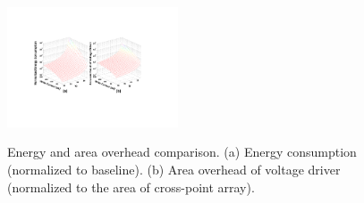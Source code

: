 %
\begin{figure}[!t]
\centering
  \includegraphics[width=0.45\textwidth]{./figures/E_and_A}\\
\vspace{-5pt}
  \caption{Energy and area overhead comparison. (a) Energy consumption (normalized to baseline). (b) Area overhead of voltage driver (normalized to the area of cross-point array).}\label{fig:E_and_A}
\vspace{-10pt}
\end{figure}


